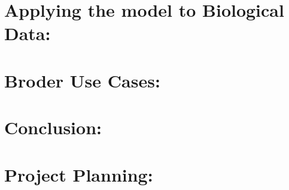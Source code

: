 \documentclass{article}
\begin{document}
\section{ Applying the model to Biological Data: }


\section{Broder Use Cases: }


\section{Conclusion:}


 



\section{Project Planning: }
\end{document}
